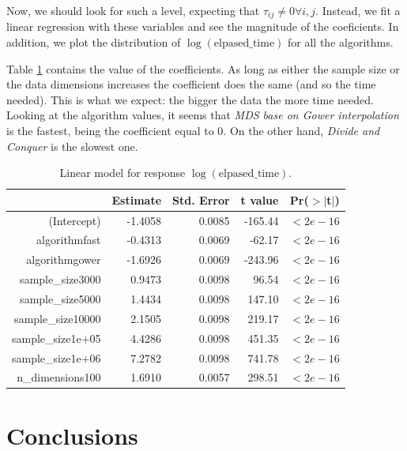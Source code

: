 \documentclass[11pt]{report}
\begin{document}
\indent Now, we should look for such a level, expecting that 
$\tau_{ij} \neq 0 \forall i,j$. Instead, we fit a linear regression with these
variables and see the magnitude of the coeficients. In addition, we plot the
distribution of $\log(\mbox{elpased\_time})$ for all the algorithms.

\indent Table \ref{lm_all_variables} contains the value of the coefficients.
As long as either the sample size or the data dimensions increases the 
coefficient does the same (and so the time needed). This is what we expect: 
the bigger the data the more time needed. Looking at the algorithm values, 
it seems that \textit{MDS base on Gower interpolation} is the fastest, 
being the coefficient equal to 0. On the other hand, 
\textit{Divide and Conquer} is the slowest one.

\begin{table}[ht]
\centering
\begin{tabular}{rrrrr}
  \hline
 & Estimate & Std. Error & t value & Pr($>$$|$t$|$) \\ 
  \hline
(Intercept) & -1.4058 & 0.0085 & -165.44 & $<2e-16$ \\ 
  algorithmfast & -0.4313 & 0.0069 & -62.17 & $<2e-16$ \\ 
  algorithmgower & -1.6926 & 0.0069 & -243.96 & $<2e-16$ \\ 
  sample\_size3000 & 0.9473 & 0.0098 & 96.54 & $<2e-16$ \\ 
  sample\_size5000 & 1.4434 & 0.0098 & 147.10 & $<2e-16$ \\ 
  sample\_size10000 & 2.1505 & 0.0098 & 219.17 & $<2e-16$ \\ 
  sample\_size1e+05 & 4.4286 & 0.0098 & 451.35 & $<2e-16$ \\ 
  sample\_size1e+06 & 7.2782 & 0.0098 & 741.78 & $<2e-16$ \\ 
  n\_dimensions100 & 1.6910 & 0.0057 & 298.51 & $<2e-16$ \\ 
   \hline
\end{tabular}
\caption{Linear model for response $\log(\mbox{elpased\_time})$.} 
\label{lm_all_variables}
\end{table}



\chapter{Conclusions}

%


\end{document}
